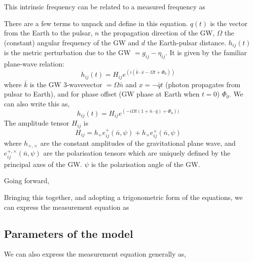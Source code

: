 \documentclass[fleqn,usenatbib,useAMS]{mnras}
\begin{document}
This intrinsic frequency can be related to a measured frequency as 


There are a few terms to unpack and define in this equation. $q(t)$ is the vector from the Earth to the pulsar, $n$ the propagation direction of the GW, $\Omega$ the (constant) angular frequency of the GW and $d$ the Earth-pulsar distance. $h_{ij}(t)$ is the metric perturbation due to the GW $= g_{ij} - \eta_{ij}$. It is given by the familiar plane-wave relation:	
\begin{equation}
	h_{ij}(t) = H_{ij} e^{(i(\bar{k} \cdot \bar{x} - \Omega t + \Phi_0))}
\end{equation}
where $\bar{k}$ is the GW 3-wavevector $=\Omega \bar{n}$ and $x = -\bar{q} t$ (photon propagates from pulsar to Earth), and for phase offset (GW phase at Earth when $t=0$) $\Phi_0$.  We can also write this as,
\begin{equation}
h_{ij}(t) = H_{ij} e^{(-i\Omega t (1 + \bar{n} \cdot \bar{q} ) + \Phi_0))}
\end{equation}
The amplitude tensor  $H_{ij}$ is
\begin{equation}
	H_{ij} = h_+ e_{ij}^+(\bar{n},\psi) + h_{\times} e_{ij}^{\times}(\bar{n},\psi)
\end{equation}
where $h_{+,\times}$ are the constant amplitudes of the gravitational plane wave, and $e_{ij}^{+, \times}(\bar{n}, \psi)$ are the polarisation tensors which are uniquely defined by the principal axes of the GW. $\psi$ is the polarisation angle of the GW. \newline 








\noindent Going forward,  \newline 




\noindent Bringing this together, and adopting a trigonometric form of the equations, we can express the measurement equation as 






\subsection{Parameters of the model}
\noindent 



We can also express the measurement equation generally as,
\end{document}
